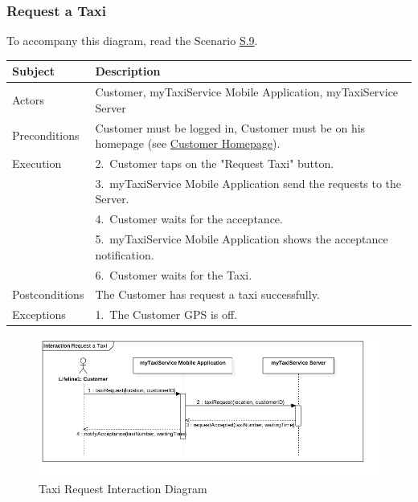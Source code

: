 \subsubsection{Request a Taxi}
			To accompany this diagram, read the Scenario \hyperref[sec:TaxiRequiringScenario]{S.9}.

				\begin{table}[htpb]
					\centering
					\label{tab:TaxiRequestTable}
					\begin{tabularx}{\textwidth}{lp{9cm}}
						\hline
						\hline
							\textbf{Subject}
						& 
							\textbf{Description}\\
						\hline
							Actors	       &  Customer, myTaxiService Mobile Application, myTaxiService Server\\
						\hline
							Preconditions  &  Customer must be logged in, Customer must be on his homepage (see \hyperref[chome_m]{Customer Homepage}).\\
						\hline
							Execution      &  2.~Customer taps on the "Request Taxi" button.\\
										   &  3.~myTaxiService Mobile Application send the requests to the Server.\\
										   &  4.~Customer waits for the acceptance.\\
										   &  5.~myTaxiService Mobile Application shows the acceptance notification.\\
										   &  6.~Customer waits for the Taxi.\\
						\hline
							Postconditions &  The Customer has request a taxi successfully.\\
						\hline
							Exceptions     &  1.~The Customer GPS is off.\\
									
						\hline
						\hline
					\end{tabularx}
				\end{table}
				
				\begin{figure}[H]
					\centering
					\includegraphics[width=\textwidth, scale=0.5]{IMG/InteractionDiagrams/TaxiRequest.png}
					\caption{Taxi Request Interaction Diagram}\label{sec:FigureTaxiRequest}
				\end{figure}